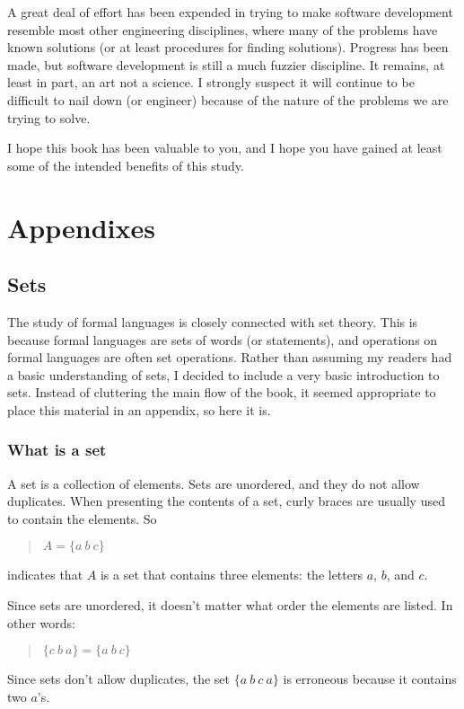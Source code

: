 \documentclass[letterpaper,12pt,openany,reqno]{book}%
\begin{document}
A great deal of effort has been expended in trying to make software development resemble most other engineering disciplines, where many of the problems have known solutions (or at least procedures for finding solutions). Progress has been made, but software development is still a much fuzzier discipline. It remains, at least in part, an art not a science. I strongly suspect it will continue to be difficult to nail down (or engineer) because of the nature of the problems we are trying to solve. 

I hope this book has been valuable to you, and I hope you have gained at least some of the intended benefits of this study.


\appendix

\part{Appendixes}

\chapter{Sets}
The study of formal languages is closely connected with set theory. This is because formal languages are sets of words (or statements), and operations on formal languages are often set operations. Rather than assuming my readers had a basic understanding of sets, I decided to include a very basic introduction to sets. Instead of cluttering the main flow of the book, it seemed appropriate to place this material in an appendix, so here it is.

\section{What is a set}
A set is a collection of elements. Sets are unordered, and they do not allow duplicates. When presenting the contents of a set, curly braces are usually used to contain the elements. So
\begin{quote}
$A = \{ a \ b \ c\}$
\end{quote}
indicates that $A$ is a set that contains three elements: the letters $a$, $b$, and $c$.

Since sets are unordered, it doesn't matter what order the elements are listed. In other words:
\begin{quote}
$\{ c \ b \ a\} = \{ a \ b \ c\}$
\end{quote}

Since sets don't allow duplicates, the set $\{ a \ b \ c \ a\}$ is erroneous because it contains two $a$'s.
\end{document}
